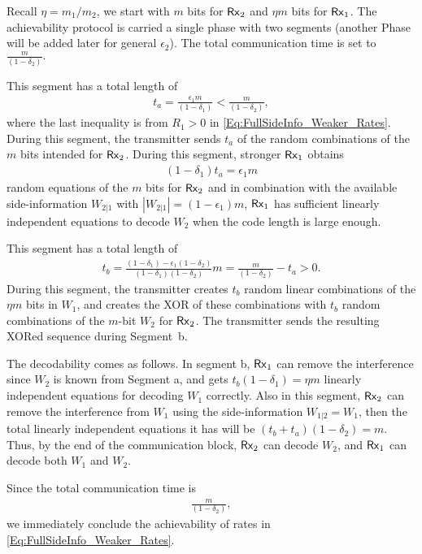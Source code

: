 \documentclass[journal,12pt,draftcls,onecolumn]{IEEEtran}
\begin{document}
 Recall $\eta=m_1/m_2$, we start with $m$ bits for ${\sf Rx}_2$ and $\eta m$ bits for ${\sf Rx}_1$. The achievability protocol is carried a single phase with two segments (another Phase will be added later for general $\epsilon_2$). The total communication time is set to $\frac{m}{(1-\delta_2)}.
$

 This segment has a total length of
\begin{align} \label{eq_NNta}
t_a = \frac{\epsilon_1m}{(1-\delta_1)} < \frac{m}{(1-\delta_2)},
\end{align}
where the last inequality is from $R_1>0$ in \eqref{Eq:FullSideInfo_Weaker_Rates}. During this segment, the transmitter sends $t_a$ of the random combinations of the $m$ bits intended for ${\sf Rx}_2$. During this segment, stronger ${\sf Rx}_1$ obtains
\begin{align}
(1-\delta_1)t_a = \epsilon_1m
\end{align}
random equations of the $m$ bits for ${\sf Rx}_2$ and in combination with the available side-information $W_{2|1}$ with $\left| W_{2|1} \right| = (1-\epsilon_1) m$, ${\sf Rx}_1$ has sufficient linearly independent equations to decode $W_2$ when the code length is large enough.

 This segment has a total length of
\begin{align} \label{eq_NNtb}
t_b = \frac{(1-\delta_1)-\epsilon_1(1-\delta_2)}{(1-\delta_1)(1-\delta_2)}m  = \frac{m}{(1-\delta_2)} - t_a > 0.
\end{align}
During this segment, the transmitter creates $t_b$ random linear combinations of the $\eta m$ bits in $W_1$, and creates the XOR of these combinations with $t_b$ random combinations of the $m$-bit $W_2$ for ${\sf Rx}_2$. The transmitter sends the resulting XORed sequence during Segment~b.

\noindent The decodability comes as follows. In segment b, ${\sf Rx}_1$ can remove the interference since $W_2$ is known from Segment a, and gets  $t_b(1-\delta_1)=\eta m$ linearly independent equations for decoding $W_1$ correctly. Also in this segment,
${\sf Rx}_2$ can remove the interference from $W_1$ using the side-information $W_{1|2} = W_1$, then the total linearly independent equations it has will be $(t_b+t_a)(1-\delta_2)=m$. Thus, by the end of the communication block, ${\sf Rx}_2$ can decode $W_2$, and ${\sf Rx}_1$ can decode both $W_1$ and $W_2$.

 Since the total communication time is
\begin{align}
\frac{m}{(1-\delta_2)},
\end{align}
we immediately conclude the achievability of rates in \eqref{Eq:FullSideInfo_Weaker_Rates}.
\end{document}
